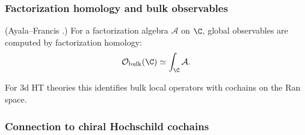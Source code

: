 \subsubsection{Factorization homology and bulk observables}

\begin{theorem}
\label{thm:bulk_factorization}
(Ayala--Francis \cite{AF15}.) For a factorization algebra $\mathcal{A}$ on $\C$, global observables are computed by factorization homology:
\begin{equation}
\mathcal{O}_{\text{bulk}}(\C) \simeq \int_\C \mathcal{A}.
\end{equation}

For 3d HT theories this identifies bulk local operators with cochains on the Ran space.
\end{theorem}

\subsubsection{Connection to chiral Hochschild cochains}

